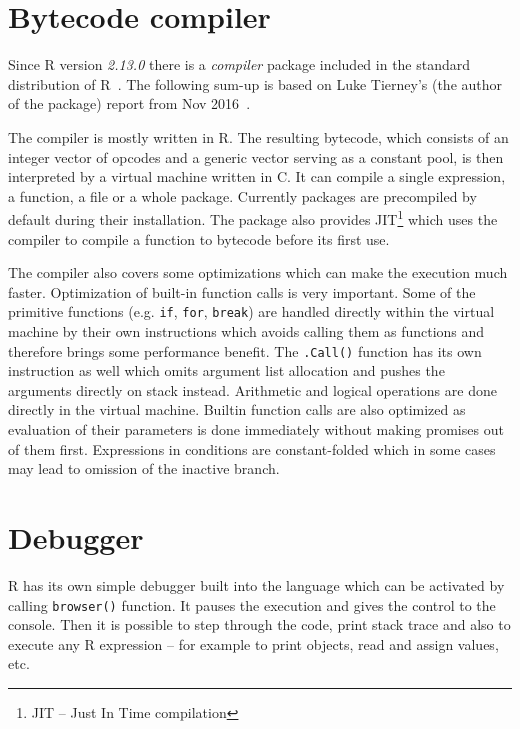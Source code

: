 \documentclass[thesis=M,english,hidelinks]{FITthesis}[2012/10/20]
\begin{document}
	\section{Bytecode compiler}
	Since R version \emph{2.13.0} there is a \emph{compiler} package included in the standard distribution of R~\cite{r_compiler_included}. The following sum-up is based on Luke Tierney's (the author of the package) report from Nov 2016~\cite{r_compiler}.\par
	
	The compiler is mostly written in R. The resulting bytecode, which consists of an integer vector of opcodes and a generic vector serving as a constant pool, is then interpreted by a virtual machine written in C. It can compile a single expression, a function, a file or a whole package. Currently packages are precompiled by default during their installation. The package also provides JIT\footnote{JIT -- Just In Time compilation} which uses the compiler to compile a function to bytecode before its first use.\par
	
	The compiler also covers some optimizations which can make the execution much faster. Optimization of built-in function calls is very important. Some of the primitive functions (e.g. \lstinline|if|, \lstinline|for|, \lstinline|break|) are handled directly within the virtual machine by their own instructions which avoids calling them as functions and therefore brings some performance benefit. The \lstinline|.Call()| function has its own instruction as well which omits argument list allocation and pushes the arguments directly on stack instead. Arithmetic and logical operations are done directly in the virtual machine. Builtin function calls are also optimized as evaluation of their parameters is done immediately without making promises out of them first. Expressions in conditions are constant-folded which in some cases may lead to omission of the inactive branch.\par
	
	\section{Debugger}
	R has its own simple debugger built into the language which can be activated by calling \lstinline|browser()| function. It pauses the execution and gives the control to the console. Then it is possible to step through the code, print stack trace and also to execute any R expression -- for example to print objects, read and assign values, etc.\par
	
\end{document}
